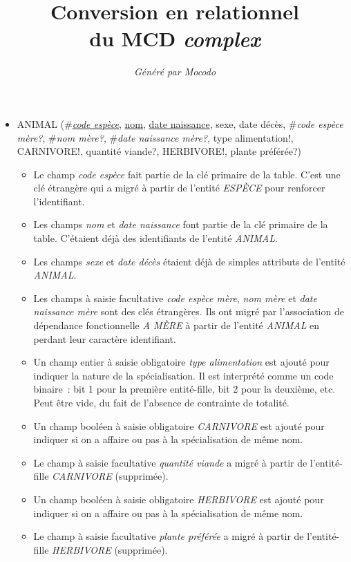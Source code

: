 \documentclass[a4paper]{article}
\title{Conversion en relationnel\\du MCD \emph{complex}}
\author{\emph{Généré par Mocodo}}
\newcommand{\relat}[1]{\textsc{#1}}
\newcommand{\attr}[1]{#1}
\newcommand{\prim}[1]{\uline{#1}}
\newcommand{\foreign}[1]{\#\textsl{#1}}
\begin{document}
\maketitle

\begin{itemize}
  \item \relat{ANIMAL} (\foreign{\prim{code espèce}}, \prim{nom}, \prim{date naissance}, \attr{sexe}, \attr{date décès}, \foreign{code espèce mère?}, \foreign{nom mère?}, \foreign{date naissance mère?}, \attr{type alimentation!}, \attr{CARNIVORE!}, \attr{quantité viande?}, \attr{HERBIVORE!}, \attr{plante préférée?})
  \begin{itemize}
    \item Le champ \emph{code espèce} fait partie de la clé primaire de la table. C'est une clé étrangère qui a migré à partir de l'entité \emph{ESPÈCE} pour renforcer l'identifiant.
    \item Les champs \emph{nom} et \emph{date naissance} font partie de la clé primaire de la table. C'étaient déjà des identifiants de l'entité \emph{ANIMAL}.
    \item Les champs \emph{sexe} et \emph{date décès} étaient déjà de simples attributs de l'entité \emph{ANIMAL}.
    \item Les champs à saisie facultative \emph{code espèce mère}, \emph{nom mère} et \emph{date naissance mère} sont des clés étrangères. Ils ont migré par l'association de dépendance fonctionnelle \emph{A MÈRE} à partir de l'entité \emph{ANIMAL} en perdant leur caractère identifiant.
    \item Un champ entier à saisie obligatoire \emph{type alimentation} est ajouté pour indiquer la nature de la spécialisation. Il est interprété comme un code binaire : bit 1 pour la première entité-fille, bit 2 pour la deuxième, etc. Peut être vide, du fait de l'absence de contrainte de totalité.
    \item Un champ booléen à saisie obligatoire \emph{CARNIVORE} est ajouté pour indiquer si on a affaire ou pas à la spécialisation de même nom.
    \item Le champ à saisie facultative \emph{quantité viande} a migré à partir de l'entité-fille \emph{CARNIVORE} (supprimée).
    \item Un champ booléen à saisie obligatoire \emph{HERBIVORE} est ajouté pour indiquer si on a affaire ou pas à la spécialisation de même nom.
    \item Le champ à saisie facultative \emph{plante préférée} a migré à partir de l'entité-fille \emph{HERBIVORE} (supprimée).
  \end{itemize}


\end{itemize}
\end{document}
